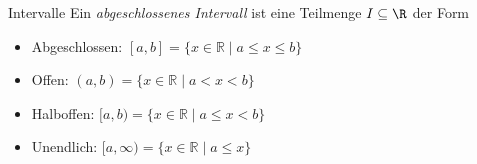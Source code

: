\begin{definition}{Intervalle}
    Ein \emph{abgeschlossenes Intervall} ist eine Teilmenge $I \subseteq \R$ der Form
    \begin{itemize}
        \item Abgeschlossen:
            $[a, b]=\{x \in \mathbb{R} \mid a \leq x \leq b\}$
        \item Offen:
            $(a, b)=\{x \in \mathbb{R} \mid a<x<b\}$
        \item Halboffen:
            $[a, b)=\{x \in \mathbb{R} \mid a \leq x<b\}$
        \item Unendlich:
            $[a, \infty)=\{x \in \mathbb{R} \mid a \leq x\}$
    \end{itemize}
\end{definition}



